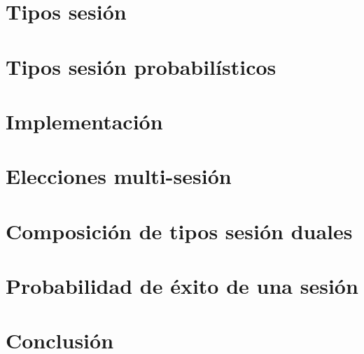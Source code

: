 \documentclass[11pt,a4paper]{tesis}
\begin{document}

\def\autor{Iván Pondal}
\def\tituloTesis{Inferencia de tipos sesión probabilísticos}
\def\runtitulo{Inferencia de tipos sesión probabilísticos}
\def\director{Hernán Melgratti}
\def\lugar{Buenos Aires, 2021}



\frontmatter
\pagestyle{empty}


\cleardoublepage


\cleardoublepage


\cleardoublepage
\tableofcontents

\listoftodos

\mainmatter
\pagestyle{headings}


\chapter{Tipos sesión}





\chapter{Tipos sesión probabilísticos}





\chapter{Implementación}



\chapter{Elecciones multi-sesión}



\chapter{Composición de tipos sesión duales}



\chapter{Probabilidad de éxito de una sesión}



\chapter{Conclusión}




\backmatter


\end{document}
